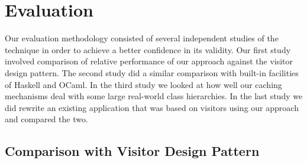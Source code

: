 \section{Evaluation} %
\label{sec:eval}

Our evaluation methodology consisted of several independent studies of the 
technique in order to achieve a better confidence in its validity. Our first 
study involved comparison of relative performance of our approach against the 
visitor design pattern. The second study did a similar comparison with built-in 
facilities of Haskell and OCaml. In the third study we looked at how well our 
caching mechanisms deal with some large real-world class hierarchies. In the 
last study we did rewrite an existing application that was based on visitors 
using our approach and compared the two.

\subsection{Comparison with Visitor Design Pattern}
\label{sec:viscmp}


